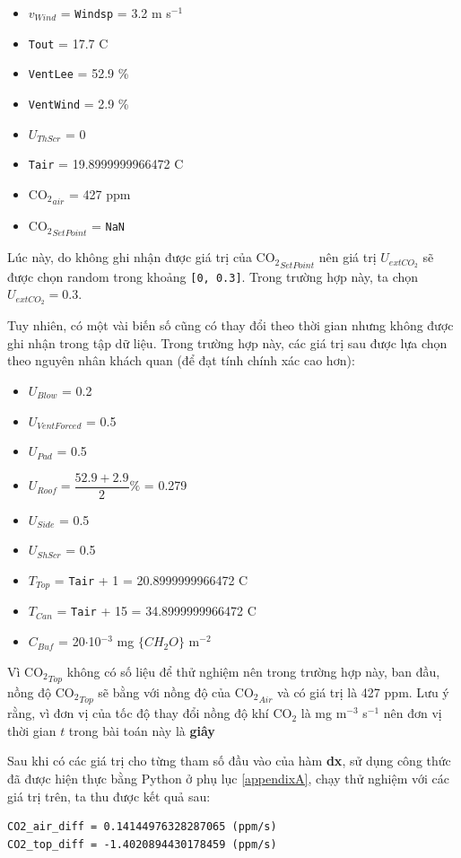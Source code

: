 \documentclass[a4paper]{article}
\begin{document}
\begin{itemize}
    \item $v_{Wind}$ = \texttt{Windsp} = 3.2 m s$^{-1}$ 
    \item \texttt{Tout} = 17.7 \degree C
    \item \texttt{VentLee} = 52.9 \%
    \item \texttt{VentWind} = 2.9 \%
    \item $U_{ThScr}$ = 0
    \item \texttt{Tair} = 19.8999999966472 \degree C
    \item $\mathrm{CO_{2}}_{air}$ = 427 ppm
    \item ${\mathrm{CO_{2}}}_{SetPoint}$ = \texttt{NaN}
\end{itemize}
Lúc này, do không ghi nhận được giá trị của $\mathrm{CO_{2}}_{SetPoint}$ nên giá trị $U_{extCO_{2}}$ sẽ được chọn random trong khoảng \texttt{[0, 0.3]}. Trong trường hợp này, ta chọn $U_{extCO_{2}} = 0.3$. \par
Tuy nhiên, có một vài biến số cũng có thay đổi theo thời gian nhưng không được ghi nhận trong tập dữ liệu. Trong trường hợp này, các giá trị sau được lựa chọn theo nguyên nhân khách quan (để đạt tính chính xác cao hơn):
\begin{itemize}
    \item $U_{Blow}$ = 0.2
    \item $U_{VentForced}$ = 0.5
    \item $U_{Pad}$ = 0.5
    \item $U_{Roof} = \dfrac{52.9 + 2.9}{2}\%$ =  0.279
    \item $U_{Side}$ = 0.5
    \item $U_{ShScr}$ = 0.5
    \item $T_{Top}$ = \texttt{Tair} + 1 = 20.8999999966472 \degree C
    \item $T_{Can}$ = \texttt{Tair} + 15 = 34.8999999966472 \degree C
    \item $C_{Buf} $ = 20$\cdot$10$^{-3}$ mg $\{CH_2O\}$ m$^{-2}$
\end{itemize}
Vì $\mathrm{CO_{2}}_{Top}$ không có số liệu để thử nghiệm nên trong trường hợp này, ban đầu, nồng độ $\mathrm{CO_{2}}_{Top}$ sẽ bằng với nồng độ của $\mathrm{CO_{2}}_{Air}$ và có giá trị là 427 $\mathrm{ppm}$. Lưu ý rằng, vì đơn vị của tốc độ thay đổi nồng độ khí $\mathrm{CO_{2}}$ là mg m$^{-3}$ s$^{-1}$ nên đơn vị thời gian $t$ trong bài toán này là \textbf{giây} \par

Sau khi có các giá trị cho từng tham số đầu vào của hàm \textbf{dx}, sử dụng công thức đã được hiện thực bằng Python ở phụ lục \ref{appendixA}, chạy thử nghiệm với các giá trị trên, ta thu được kết quả sau:
\begin{verbatim}
CO2_air_diff = 0.14144976328287065 (ppm/s)
CO2_top_diff = -1.4020894430178459 (ppm/s)
\end{verbatim}
\end{document}
